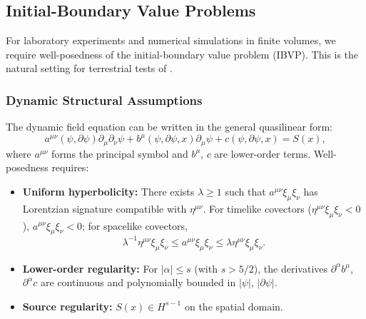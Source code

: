 \subsection{Initial-Boundary Value Problems}\label{sec:ibvp}

For laboratory experiments and numerical simulations in finite volumes, 
we require well-posedness of the initial-boundary value problem (IBVP). 
This is the natural setting for terrestrial tests of \DFD.

\subsubsection{Dynamic Structural Assumptions}

The dynamic field equation can be written in the general quasilinear form:
\begin{equation}
a^{\mu\nu}(\psi,\partial\psi)\partial_\mu\partial_\nu\psi 
+ b^\mu(\psi,\partial\psi,x)\partial_\mu\psi + c(\psi,\partial\psi,x) = S(x),
\label{eq:dynamic-general}
\end{equation}
where $a^{\mu\nu}$ forms the principal symbol and $b^\mu$, $c$ are lower-order 
terms. Well-posedness requires:

\begin{itemize}
\item[\textbf{(A1$'$)}] \textbf{Uniform hyperbolicity:} There exists $\lambda \geq 1$ 
such that $a^{\mu\nu}\xi_\mu\xi_\nu$ has Lorentzian signature compatible with 
$\eta^{\mu\nu}$. For timelike covectors ($\eta^{\mu\nu}\xi_\mu\xi_\nu < 0$), 
$a^{\mu\nu}\xi_\mu\xi_\nu < 0$; for spacelike covectors,
\begin{equation}
\lambda^{-1}\eta^{\mu\nu}\xi_\mu\xi_\nu \leq a^{\mu\nu}\xi_\mu\xi_\nu \leq \lambda\eta^{\mu\nu}\xi_\mu\xi_\nu.
\end{equation}

\item[\textbf{(A2$'$)}] \textbf{Lower-order regularity:} For $|\alpha| \leq s$ 
(with $s > 5/2$), the derivatives $\partial^\alpha b^\mu$, $\partial^\alpha c$ 
are continuous and polynomially bounded in $|\psi|$, $|\partial\psi|$.

\item[\textbf{(A3$'$)}] \textbf{Source regularity:} $S(x) \in H^{s-1}$ on the 
spatial domain.
\end{itemize}

